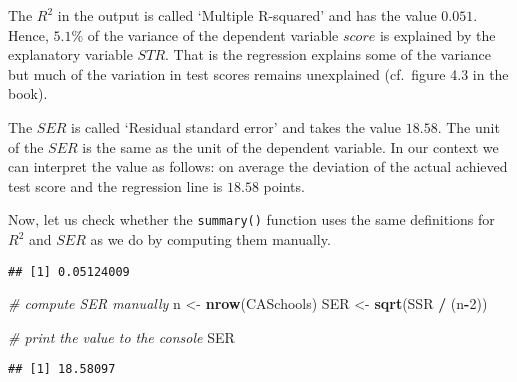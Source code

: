 \documentclass[]{book}
\newenvironment{Shaded}{\begin{snugshade}}{\end{snugshade}}
\newcommand{\KeywordTok}[1]{\textcolor[rgb]{0.13,0.29,0.53}{\textbf{#1}}}
\newcommand{\DecValTok}[1]{\textcolor[rgb]{0.00,0.00,0.81}{#1}}
\newcommand{\StringTok}[1]{\textcolor[rgb]{0.31,0.60,0.02}{#1}}
\newcommand{\CommentTok}[1]{\textcolor[rgb]{0.56,0.35,0.01}{\textit{#1}}}
\newcommand{\OperatorTok}[1]{\textcolor[rgb]{0.81,0.36,0.00}{\textbf{#1}}}
\newcommand{\NormalTok}[1]{#1}
\theoremstyle{definition}
\theoremstyle{definition}
\theoremstyle{definition}
\theoremstyle{remark}
\begin{document}
The \(R^2\) in the output is called `Multiple R-squared' and has the
value \(0.051\). Hence, \(5.1 \%\) of the variance of the dependent
variable \(score\) is explained by the explanatory variable \(STR\).
That is the regression explains some of the variance but much of the
variation in test scores remains unexplained (cf.~figure 4.3 in the
book).

The \(SER\) is called `Residual standard error' and takes the value
\(18.58\). The unit of the \(SER\) is the same as the unit of the
dependent variable. In our context we can interpret the value as
follows: on average the deviation of the actual achieved test score and
the regression line is \(18.58\) points.

Now, let us check whether the \texttt{summary()} function uses the same
definitions for \(R^2\) and \(SER\) as we do by computing them manually.

\begin{Shaded}
\end{Shaded}

\begin{verbatim}
## [1] 0.05124009
\end{verbatim}

\begin{Shaded}
\begin{Highlighting}[]
\CommentTok{# compute SER manually}
\NormalTok{n <-}\StringTok{ }\KeywordTok{nrow}\NormalTok{(CASchools)}
\NormalTok{SER <-}\StringTok{ }\KeywordTok{sqrt}\NormalTok{(SSR }\OperatorTok{/}\StringTok{ }\NormalTok{(n}\OperatorTok{-}\DecValTok{2}\NormalTok{))}

\CommentTok{# print the value to the console}
\NormalTok{SER}
\end{Highlighting}
\end{Shaded}

\begin{verbatim}
## [1] 18.58097
\end{verbatim}
\end{document}
